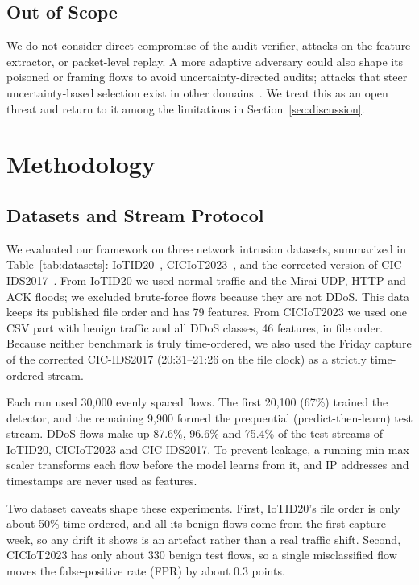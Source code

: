 \documentclass[conference]{IEEEtran}
\begin{document}
\subsection{Out of Scope}
We do not consider direct compromise of the audit verifier, attacks on the
feature extractor, or packet-level replay. A more adaptive adversary could also
shape its poisoned or framing flows to avoid uncertainty-directed audits;
attacks that steer uncertainty-based selection exist in other
domains~\cite{zhi2025ala}. We treat this as an open threat and return to it
among the limitations in Section~\ref{sec:discussion}.

\section{Methodology}\label{sec:method}

\subsection{Datasets and Stream Protocol}
We evaluated our framework on three network intrusion datasets, summarized in
Table~\ref{tab:datasets}: IoTID20~\cite{ullah2020iotid20},
CICIoT2023~\cite{neto2023ciciot}, and the corrected version of
CIC-IDS2017~\cite{sharafaldin2018cicids,engelen2021troubleshooting}. From
IoTID20 we used normal traffic and the Mirai UDP, HTTP and ACK floods; we
excluded brute-force flows because they are not DDoS. This data keeps its
published file order and has 79 features. From CICIoT2023 we used one CSV part
with benign traffic and all DDoS classes, 46 features, in file order. Because
neither benchmark is truly time-ordered, we also used the Friday capture of the
corrected CIC-IDS2017 (20:31--21:26 on the file clock) as a strictly
time-ordered stream.

Each run used 30{,}000 evenly spaced flows. The first 20{,}100 (67\%) trained
the detector, and the remaining 9{,}900 formed the prequential
(predict-then-learn) test stream. DDoS flows make up 87.6\%, 96.6\% and 75.4\%
of the test streams of IoTID20, CICIoT2023 and CIC-IDS2017. To prevent leakage,
a running min-max scaler transforms each flow before the model learns from it,
and IP addresses and timestamps are never used as features.

Two dataset caveats shape these experiments. First, IoTID20's file order is
only about 50\% time-ordered, and all its benign flows come from the first
capture week, so any drift it shows is an artefact rather than a real traffic
shift. Second, CICIoT2023 has only about 330 benign test flows, so a single
misclassified flow moves the false-positive rate (FPR) by about 0.3 points.
\end{document}
